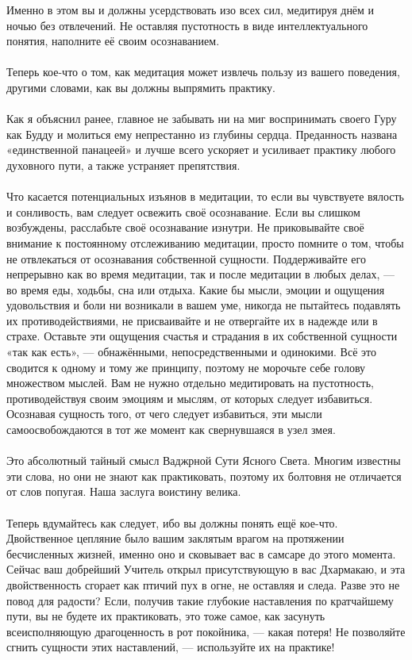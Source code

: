 Именно в этом вы и должны усердствовать изо всех сил, медитируя днём и ночью без отвлечений. Не оставляя пустотность в виде интеллектуального понятия, наполните её своим осознаванием.
\\ \\ Теперь кое-что о том, как медитация может извлечь пользу из вашего поведения, другими словами, как вы должны выпрямить практику.
\\ \\ Как я объяснил ранее, главное не забывать ни на миг воспринимать своего Гуру как Будду и молиться ему непрестанно из глубины сердца. Преданность названа «единственной панацеей» и лучше всего ускоряет и усиливает практику любого духовного пути, а также устраняет препятствия.
\\ \\ Что касается потенциальных изъянов в медитации, то если вы чувствуете вялость и сонливость, вам следует освежить своё осознавание. Если вы слишком возбуждены, расслабьте своё осознавание изнутри. Не приковывайте своё внимание к постоянному отслеживанию медитации, просто помните о том, чтобы не отвлекаться от осознавания собственной сущности. Поддерживайте его непрерывно как во время медитации, так и после медитации в любых делах, — во время еды, ходьбы, сна или отдыха. Какие бы мысли, эмоции и ощущения удовольствия и боли ни возникали в вашем уме, никогда не пытайтесь подавлять их противодействиями, не присваивайте и не отвергайте их в надежде или в страхе. Оставьте эти ощущения счастья и страдания в их собственной сущности «так как есть», — обнажёнными, непосредственными и одинокими. Всё это сводится к одному и тому же принципу, поэтому не морочьте себе голову множеством мыслей. Вам не нужно отдельно медитировать на пустотность, противодействуя сво\-им эмоциям и мыслям, от которых следует избавиться. Осознавая сущность того, от чего следует избавиться, эти мысли самоосвобождаются в тот же момент как свернувшаяся в узел змея.
\\ \\ Это абсолютный тайный смысл Ваджрной Сути Ясного Света. Многим известны эти слова, но они не знают как практиковать, поэтому их болтовня не отличается от слов попугая. Наша заслуга воистину велика.
\\ \\ Теперь вдумайтесь как следует, ибо вы должны понять ещё кое-что. Двойственное цепляние было вашим заклятым врагом на протяжении бесчисленных жизней, именно оно и сковывает вас в самсаре до этого момента. Сейчас ваш добрейший Учитель открыл присутствующую в вас Дхармакаю, и эта двойственность сгорает как птичий пух в огне, не оставляя и следа. Разве это не повод для радости? Если, получив такие глубокие наставления по кратчайшему пути, вы не будете их практиковать, это тоже самое, как засунуть всеисполняющую драгоценность в рот покойника, — какая потеря! Не позволяйте сгнить сущности этих наставлений, — используйте их на прак\-ти\-ке!
